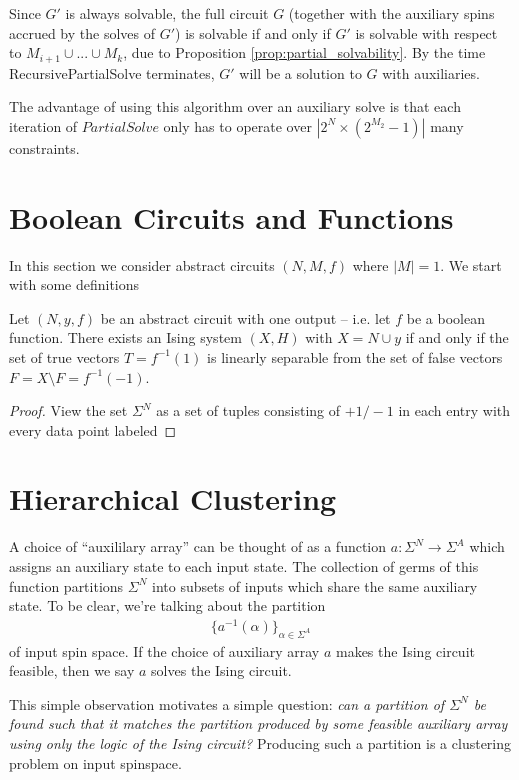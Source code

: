 \documentclass{article}
\begin{document}
Since $G'$ is always solvable, the full circuit $G$ (together with the auxiliary spins accrued by the solves of $G'$) is solvable if and only if $G'$ is solvable with respect to $M_{i+1} \cup ... \cup M_k$, due to Proposition \ref{prop:partial_solvability}. By the time RecursivePartialSolve terminates, $G'$ will be a solution to $G$ with auxiliaries.

The advantage of using this algorithm over an auxiliary solve is that each iteration of $PartialSolve$ only has to operate over $|2^N\times (2^{M_2} - 1)|$ many constraints.



\section{Boolean Circuits and Functions}\label{sec:bool-circuits}
In this section we consider abstract circuits $(N, M, f)$ where $|M| = 1$. We start with some definitions 

\begin{prop}\label{prop:boolean-ising-svm-equiv}
  Let $(N, {y}, f)$ be an abstract circuit with one output -- i.e. let $f$ be a boolean function. There exists an Ising system $(X,H)$ with $X = N \cup {y}$ if and only if the set of true vectors $T = f^{-1}(1)$ is linearly separable from the set of false vectors $F = X \setminus F = f^{-1}(-1)$.
\end{prop}
\begin{proof}
  View the set $\Sigma^N$ as a set of tuples consisting of $+1/-1$ in each entry with every data point labeled 
\end{proof}
\section{Hierarchical Clustering}

A choice of ``auxililary array'' can be thought of as a function $a:\Sigma^N \to \Sigma^A$ which assigns an auxiliary state to each input state. The collection of germs of this function partitions $\Sigma^N$ into subsets of inputs which share the same auxiliary state. To be clear, we're talking about the partition
\begin{align*}
  \{a^{-1}(\alpha)\}_{\alpha \in \Sigma^A}
\end{align*}
of input spin space. If the choice of auxiliary array $a$ makes the Ising circuit feasible, then we say $a$ solves the Ising circuit.

This simple observation motivates a simple question: \emph{can a partition of $\Sigma^N$ be found such that it matches the partition produced by some feasible auxiliary array using only the logic of the Ising circuit?} Producing such a partition is a clustering problem on input spinspace.
\end{document}
